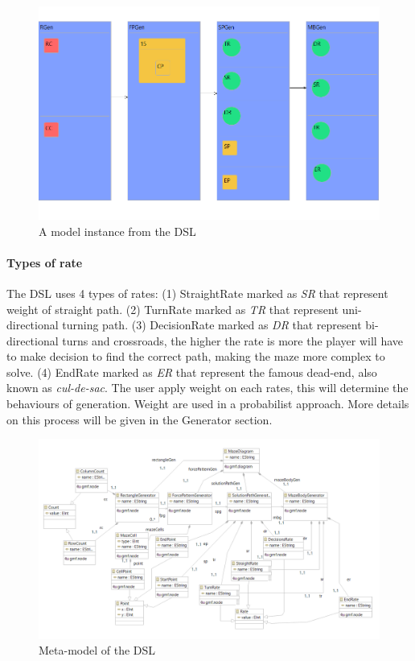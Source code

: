 \documentclass[review]{elsarticle}
\begin{document}
\begin{figure}
	\includegraphics[width=\linewidth]{model.png}
	\caption{A model instance from the DSL}
	\label{fig:model}
\end{figure}

\paragraph{Types of rate}
The DSL uses 4 types of rates: (1) StraightRate marked as \textit{SR} that represent weight of straight path. (2) TurnRate marked as \textit{TR} that represent uni-directional turning path. (3) DecisionRate marked as \textit{DR} that represent bi-directional turns and crossroads, the higher the rate is more the player will have to make decision to find the correct path, making the maze more complex to solve. (4) EndRate marked as \textit{ER} that represent the famous dead-end, also known as  \textit{cul-de-sac}. The user apply weight on each rates, this will determine the behaviours of generation. Weight are used in a probabilist approach. More details on this process will be given in the Generator section.

\begin{figure}
	\includegraphics[width=\linewidth]{metamodel.png}
	\caption{Meta-model of the DSL}
	\label{fig:metamodel}
\end{figure}
\end{document}
